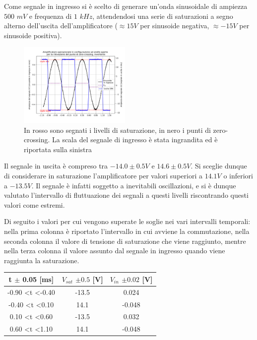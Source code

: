 \documentclass[journal]{IEEEtran}
\begin{document}
Come segnale in ingresso si è scelto di generare un'onda sinusoidale di ampiezza $500$ $mV$ e frequenza di $1$ $kHz$, attendendosi una serie di saturazioni a segno alterno dell'uscita dell'amplificatore ($ \approx 15 V$ per sinusoide negativa, $\approx -15 V$ per sinusoide positiva).

\begin{figure}[h]%
\begin {center}
\includegraphics[width=0.48\textwidth]{analysis/output/opa-open-loop-inv-zero-crossing-z2.pdf}
\caption{In rosso sono segnati i livelli di saturazione, in nero i punti di zero-crossing. La scala del segnale di ingresso è stata ingrandita ed è riportata sulla sinistra}
\label{fig:open_loop_inv_zc_2}
\end {center}
\end{figure}

Il segnale in uscita è compreso tra $-14.0 \pm 0.5 V $  e $14.6 \pm 0.5 V$.
Si sceglie dunque di considerare in saturazione l'amplificatore per valori superiori a $14.1 V$ o inferiori a $-13.5 V$. Il segnale è infatti soggetto a inevitabili oscillazioni, e si è dunque valutato l'intervallo di fluttuazione dei segnali a questi livelli riscontrando questi valori come estremi.

Di seguito i valori per cui vengono superate le soglie nei vari intervalli temporali: nella prima colonna è riportato l'intervallo in cui avviene la commutazione, nella seconda colonna il valore di tensione di saturazione che viene raggiunto, mentre nella terza colonna il valore assunto dal segnale in ingresso quando viene raggiunta la saturazione.

\newline

\begin{tabular}{|c|c|c|}
\hline
    t $\pm$ 0.05 {[}ms{]} & $V_{sat}$ $\pm 0.5$ {[}V{]} & $V_{in}$ $\pm 0.02$ {[}V{]} \\ \hline
-0.90 \textless t \textless -0.40 & -13.5 & 0.024  \\ \hline
-0.40 \textless t \textless 0.10  & 14.1  & -0.048 \\ \hline
0.10 \textless t \textless 0.60   & -13.5 & 0.032  \\ \hline
0.60 \textless t \textless 1.10   & 14.1  & -0.048 \\  \hline
\end{tabular}\\
\newline
\end{document}
